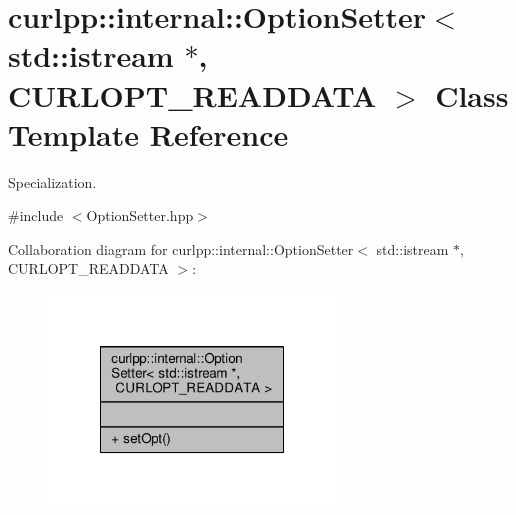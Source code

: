 \hypertarget{classcurlpp_1_1internal_1_1OptionSetter_3_01std_1_1istream_01_5_00_01CURLOPT__READDATA_01_4}{\section{curlpp\-:\-:internal\-:\-:Option\-Setter$<$ std\-:\-:istream $\ast$, C\-U\-R\-L\-O\-P\-T\-\_\-\-R\-E\-A\-D\-D\-A\-T\-A $>$ Class Template Reference}
\label{classcurlpp_1_1internal_1_1OptionSetter_3_01std_1_1istream_01_5_00_01CURLOPT__READDATA_01_4}
}


Specialization.  




{\ttfamily \#include $<$Option\-Setter.\-hpp$>$}



Collaboration diagram for curlpp\-:\-:internal\-:\-:Option\-Setter$<$ std\-:\-:istream $\ast$, C\-U\-R\-L\-O\-P\-T\-\_\-\-R\-E\-A\-D\-D\-A\-T\-A $>$\-:
\nopagebreak
\begin{figure}[H]
\begin{center}
\leavevmode
\includegraphics[width=216pt]{classcurlpp_1_1internal_1_1OptionSetter_3_01std_1_1istream_01_5_00_01CURLOPT__READDATA_01_4__coll__graph}
\end{center}
\end{figure}
